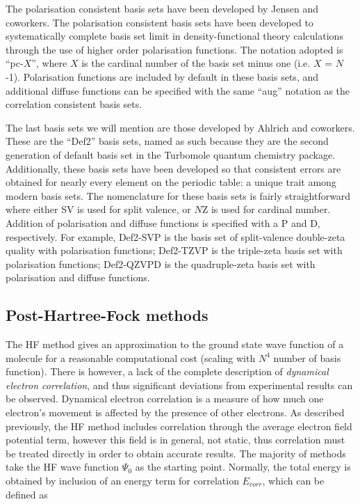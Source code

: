 \vspace{3mm}
\vspace{1mm}

The polarisation consistent basis sets have been developed by Jensen and coworkers.\cite{Jensen2001} The polarisation consistent basis sets have been developed to systematically complete basis set limit in density-functional theory calculations through the use of higher order polarisation functions. The notation adopted is ``pc-$X$'', where $X$ is the cardinal number of the basis set minus one (i.e. $X$ = $N$-1). Polarisation functions are included by default in these basis sets, and additional diffuse functions can be specified with the same ``aug'' notation as the correlation consistent basis sets.

\vspace{3mm}
\vspace{1mm}

The last basis sets we will mention are those developed by Ahlrich and coworkers.\cite{Schafer1992,Weigend2005} These are the ``Def2'' basis sets, named as such because they are the second generation of default basis set in the Turbomole quantum chemistry package.\cite{turbomole} Additionally, these basis sets have been developed so that consistent errors are obtained for nearly every element on the periodic table: a unique trait among modern basis sets. The nomenclature for these basis sets is fairly straightforward where either SV is used for split valence, or $N$Z is used for cardinal number. Addition of polarisation and diffuse functions is specified with a P and D, respectively. For example, Def2-SVP is the basis set of split-valence double-zeta quality with polarisation functions; Def2-TZVP is the triple-zeta basis set with polarisation functions; Def2-QZVPD is the quadruple-zeta basis set with polarisation and diffuse functions.

\subsection{Post-Hartree-Fock methods}

The HF method gives an approximation to the ground state wave function of a molecule for a reasonable computational cost (scaling with $N^4$ number of basis function). There is however, a lack of the complete description of \emph{dynamical electron correlation},\cite{Cramer2004} and thus significant deviations from experimental results can be observed. Dynamical electron correlation is a measure of how much one electron's movement is affected by the presence of other electrons. As described previously, the HF method includes correlation through the average electron field potential term, however this field is in general, not static, thus correlation must be treated directly in order to obtain accurate results. The majority of methods take the HF wave function $\Psi_0$ as the starting point. Normally, the total energy is obtained by inclusion of an energy term for correlation $E_{corr}$, which can be defined as


